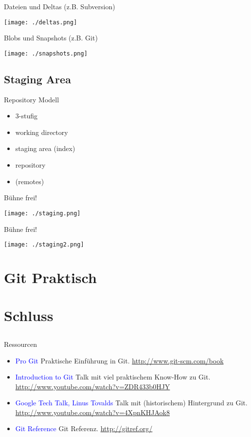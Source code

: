 \begin{frame}{Dateien und Deltas (z.B. Subversion)}
    \centerline{\texttt{[image: ./deltas.png]}}
\end{frame}

\begin{frame}{Blobs und Snapshots (z.B. Git)}
    \centerline{\texttt{[image: ./snapshots.png]}}
\end{frame}

\subsection{Staging Area}

\begin{frame}{Repository Modell}
    \begin{itemize}[<+->]
        \item 3-stufig
        \item working directory
        \item staging area (index)
        \item repository
        \item (remotes)
    \end{itemize}
\end{frame}

\begin{frame}{Bühne frei!}
    \centerline{\texttt{[image: ./staging.png]}}
\end{frame}

\begin{frame}{Bühne frei!}
    \centerline{\texttt{[image: ./staging2.png]}}
\end{frame}

\section{Git Praktisch}

\section{Schluss}
\subsection{}

\begin{frame}{Ressourcen}
    \begin{itemize}[<+->]
        \item \textcolor{blue}{Pro Git} Praktische Einführung in Git. \url{http://www.git-scm.com/book}
        \item \textcolor{blue}{Introduction to Git} Talk mit viel praktischem Know-How zu Git. \url{http://www.youtube.com/watch?v=ZDR433b0HJY}
        \item \textcolor{blue}{Google Tech Talk, Linus Tovalds} Talk mit (historischem) Hintergrund zu Git. \url{http://www.youtube.com/watch?v=4XpnKHJAok8}
        \item \textcolor{blue}{Git Reference} Git Referenz. \url{http://gitref.org/}
    \end{itemize}
\end{frame}

